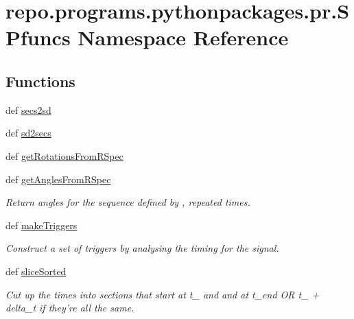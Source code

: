 \hypertarget{namespacerepo_1_1programs_1_1pythonpackages_1_1pr_1_1SPfuncs}{\section{repo.\-programs.\-pythonpackages.\-pr.\-S\-Pfuncs Namespace Reference}
\label{namespacerepo_1_1programs_1_1pythonpackages_1_1pr_1_1SPfuncs}
}
\subsection*{Functions}
\begin{DoxyCompactItemize}
\item 
def \hyperlink{namespacerepo_1_1programs_1_1pythonpackages_1_1pr_1_1SPfuncs_a9d03b1e8bb9325cdab8fa026d6cdbbe3}{secs2sd}
\item 
def \hyperlink{namespacerepo_1_1programs_1_1pythonpackages_1_1pr_1_1SPfuncs_aca5c571c3ee666190d0568fbcd72f1a9}{sd2secs}
\item 
def \hyperlink{namespacerepo_1_1programs_1_1pythonpackages_1_1pr_1_1SPfuncs_aba724f914a5cc838851518564a1f5d84}{get\-Rotations\-From\-R\-Spec}
\item 
def \hyperlink{namespacerepo_1_1programs_1_1pythonpackages_1_1pr_1_1SPfuncs_a2533afa952ea007cfad4a1deb6a607a5}{get\-Angles\-From\-R\-Spec}
\begin{DoxyCompactList}\small\item\em Return angles for the sequence defined by , repeated  times. \end{DoxyCompactList}\item 
def \hyperlink{namespacerepo_1_1programs_1_1pythonpackages_1_1pr_1_1SPfuncs_af8a48b74a6d4e725e2409329126076a6}{make\-Triggers}
\begin{DoxyCompactList}\small\item\em Construct a set of triggers by analysing the timing for the signal. \end{DoxyCompactList}\item 
def \hyperlink{namespacerepo_1_1programs_1_1pythonpackages_1_1pr_1_1SPfuncs_a87aac33304db20fd58d7a3625061cca6}{slice\-Sorted}
\begin{DoxyCompactList}\small\item\em Cut up the times  into sections that start at t\-\_ and and at t\-\_\-end O\-R t\-\_ + delta\-\_\-t if they're all the same. \end{DoxyCompactList}\item 

\end{DoxyCompactItemize}
